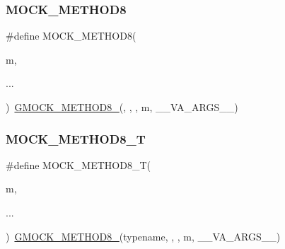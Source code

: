 \mbox{\label{_obj__test_2lib_2googletest-release-1_88_81_2googlemock_2include_2gmock_2gmock-generated-function-mockers_8h_ae77220bef9ab254c331b9026a3d18dba}} 
\subsubsection{\texorpdfstring{MOCK\_METHOD8}{MOCK\_METHOD8}}
{\footnotesize\ttfamily \#define M\+O\+C\+K\+\_\+\+M\+E\+T\+H\+O\+D8(\begin{DoxyParamCaption}\item[{}]{m,  }\item[{}]{... }\end{DoxyParamCaption})~\mbox{\hyperlink{_obj__test_2lib_2googletest-release-1_88_81_2googlemock_2include_2gmock_2gmock-generated-function-mockers_8h_aa84a36427c44505207b7cad5dec7ad67}{G\+M\+O\+C\+K\+\_\+\+M\+E\+T\+H\+O\+D8\+\_\+}}(, , , m, \+\_\+\+\_\+\+V\+A\+\_\+\+A\+R\+G\+S\+\_\+\+\_\+)}

\mbox{\label{_obj__test_2lib_2googletest-release-1_88_81_2googlemock_2include_2gmock_2gmock-generated-function-mockers_8h_aa7e6573bb6a57f2a2d3c2875caeffaa3}} 
\subsubsection{\texorpdfstring{MOCK\_METHOD8\_T}{MOCK\_METHOD8\_T}}
{\footnotesize\ttfamily \#define M\+O\+C\+K\+\_\+\+M\+E\+T\+H\+O\+D8\+\_\+T(\begin{DoxyParamCaption}\item[{}]{m,  }\item[{}]{... }\end{DoxyParamCaption})~\mbox{\hyperlink{_obj__test_2lib_2googletest-release-1_88_81_2googlemock_2include_2gmock_2gmock-generated-function-mockers_8h_aa84a36427c44505207b7cad5dec7ad67}{G\+M\+O\+C\+K\+\_\+\+M\+E\+T\+H\+O\+D8\+\_\+}}(typename, , , m, \+\_\+\+\_\+\+V\+A\+\_\+\+A\+R\+G\+S\+\_\+\+\_\+)}

